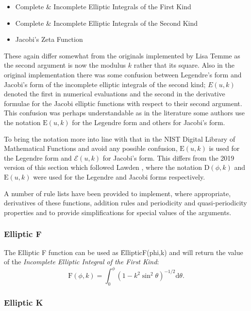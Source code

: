 \begin{itemize}
\item Complete \& Incomplete Elliptic Integrals of the First Kind
\item Complete \& Incomplete Elliptic Integrals of the Second Kind
\item Jacobi's Zeta Function
\end{itemize}

These again differ somewhat from the originals implemented by Lisa Temme
as the second argument is now the modulus $k$ rather that its square.
Also in the original implementation  there was some confusion between
Legendre's form and Jacobi's form of the incomplete elliptic integrals of
the second kind; $E(u,k)$ denoted the first in numerical
evaluations and the second in the derivative formulae for the Jacobi
elliptic functions with respect to their second argument.
This confusion was perhaps understandable
as in the literature some authors use the notation $\mathrm{E}(u, k)$ for
the Legendre form and others for Jacobi's form.

To bring the notation more into line with that in the NIST Digital Library of
Mathematical Functions and avoid any possible confusion, $\mathrm{E}(u, k)$ is used for
the Legendre form and $\mathcal{E}(u, k)$ for Jacobi's form.
This differs from the 2019 version of this section which followed Lawden \cite{Lawden:89},
where the notation $\mathrm{D}(\phi, k)$  and $\mathrm{E}(u, k)$ were used for the
Legendre and Jacobi forms respectively.

A number of rule lists have been provided to implement, where appropriate,
derivatives of these functions, addition rules and periodicity and
quasi-periodicity properties and to provide simplifications for special values
of the arguments.

\subsubsection{Elliptic F}
\hypertarget{operator:ELLIPTICF}{}

The Elliptic F function can be used as \f{EllipticF(phi,k)} and
will return the value of the \emph{Incomplete Elliptic Integral of the
First Kind}:
\[\mathrm{F}(\phi, k)=\int_0^\phi(1-k^2 \sin^2 \theta)^{-1/2} \mathrm{d}\theta.\]

\subsubsection{Elliptic K}
\hypertarget{operator:ELLIPTICK}{}

